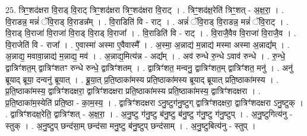 \documentclass[17pt]{extarticle}
\begin{document}
25. त्रिꣳ॒॒शद॑क्षरा वि॒राड् वि॒राट् त्रिꣳ॒॒शद॑क्षरा त्रिꣳ॒॒शद॑क्षरा वि॒राट् । . त्रिꣳ॒॒शद॑क्ष॒रेति॑ त्रिꣳ॒॒शत् - अ॒क्ष॒रा॒ । . वि॒राडन्न॒ मन्नं॑ ॅवि॒राड् वि॒राडन्न᳚म् । . वि॒राडिति॑ वि - राट् । . अन्नं॑ ॅवि॒राड् वि॒राडन्न॒ मन्नं॑ ॅवि॒राट् । . वि॒राड् वि॒राजा॑ वि॒राजा॑ वि॒राड् वि॒राड् वि॒राजा᳚ । . वि॒राडिति॑ वि - राट् । . वि॒राजै॒वैव वि॒राजा॑ वि॒राजै॒व । . वि॒राजेति॑ वि - राजा᳚ । . ए॒वास्मा॑ अस्मा ए॒वैवास्मै᳚ । . अ॒स्मा॒ अ॒न्नाद्य॑ म॒न्नाद्य॑ मस्मा अस्मा अ॒न्नाद्य᳚म् । . अ॒न्नाद्य॒ मवावा॒न्नाद्य॑ म॒न्नाद्य॒ मव॑ । . अ॒न्नाद्य॒मित्य॑न्न - अद्य᳚म् । . अव॑ रुन्धे रु॒न्धे ऽवाव॑ रुन्धे । . रु॒न्धे॒ द्वात्रिꣳ॑शत॒म् द्वात्रिꣳ॑शतꣳ रुन्धे रुन्धे॒ द्वात्रिꣳ॑शतम् । . द्वात्रिꣳ॑शत॒ मन्वनु॒ द्वात्रिꣳ॑शत॒म् द्वात्रिꣳ॑शत॒ मनु॑ । . अनु॑ ब्रूयाद् ब्रूया॒ दन्वनु॑ ब्रूयात् । . ब्रू॒या॒त् प्र॒ति॒ष्ठाका॑मस्य प्रति॒ष्ठाका॑मस्य ब्रूयाद् ब्रूयात् प्रति॒ष्ठाका॑मस्य । . प्र॒ति॒ष्ठाका॑मस्य॒ द्वात्रिꣳ॑शदक्षरा॒ द्वात्रिꣳ॑शदक्षरा प्रति॒ष्ठाका॑मस्य प्रति॒ष्ठाका॑मस्य॒ द्वात्रिꣳ॑शदक्षरा । . प्र॒ति॒ष्ठाका॑म॒स्येति॑ प्रति॒ष्ठा - का॒म॒स्य॒ । . द्वात्रिꣳ॑शदक्षरा ऽनु॒ष्टुग॑नु॒ष्टुग् द्वात्रिꣳ॑शदक्षरा॒ द्वात्रिꣳ॑शदक्षरा ऽनु॒ष्टुक् । . द्वात्रिꣳ॑शदक्ष॒रेति॒ द्वात्रिꣳ॑शत् - अ॒क्ष॒रा॒ । . अ॒नु॒ष्टु ग॑नु॒ष्टु ब॑नु॒ष्टु ब॑नु॒ष्टु ग॑नु॒ष्टु ग॑नु॒ष्टुप् । . अ॒नु॒ष्टुगित्य॑नु - स्तुक् । . अ॒नु॒ष्टुप् छन्द॑सा॒म् छन्द॑सा मनु॒ष्टु ब॑नु॒ष्टुप् छन्द॑साम् । . अ॒नु॒ष्टुबित्य॑नु - स्तुप् । \newline
\end{document}
